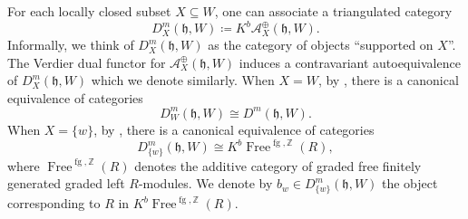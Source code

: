\documentclass{amsart}
\newcommand{\Z}{\mathbb{Z}}
\newcommand{\scrA}{\mathcal{A}}
\DeclareMathOperator{\Free}{Free}
\newcommand{\BE}{D^m}
\newcommand{\fr}[1]{\mathfrak{#1}}
\DeclareMathOperator{\fg}{fg}
\theoremstyle{definition}
\begin{document}
        For each locally closed subset $X \subseteq W$, one can associate a triangulated category
        \[\BE_X (\fr{h}, W) \coloneq K^b \scrA^{\oplus}_{ X} (\fr{h}, W).\]
        Informally, we think of $\BE_X (\fr{h}, W)$ as the category of objects ``supported on $X$''. The Verdier dual functor for $\scrA^{\oplus}_{ X} (\fr{h}, W)$ induces a contravariant autoequivalence of $\BE_X (\fr{h}, W)$ which we denote similarly.
        When $X = W$, by \cite[Remark 6.3 (1)]{ARV}, there is a canonical equivalence of categories 
        \begin{equation}\label{eq:BE_W}
                 \BE_W (\fr{h}, W) \cong \BE (\fr{h}, W).
        \end{equation}
        When $X = \{w\}$, by \cite[Lemma 4.4]{ARV}, there is a canonical equivalence of categories 
        \begin{equation}\label{eq:single_stratum}
                \BE_{\{w\}} (\fr{h}, W) \cong K^b \Free^{\fg, \Z} (R),
        \end{equation}
        where $\Free^{\fg, \Z} (R)$ denotes the additive category of graded free finitely generated graded left $R$-modules.
        We denote by $b_w \in \BE_{\{w\}} (\fr{h}, W)$ the object corresponding to $R$ in $K^b \Free^{\fg, \Z} (R)$.
        
\end{document}
